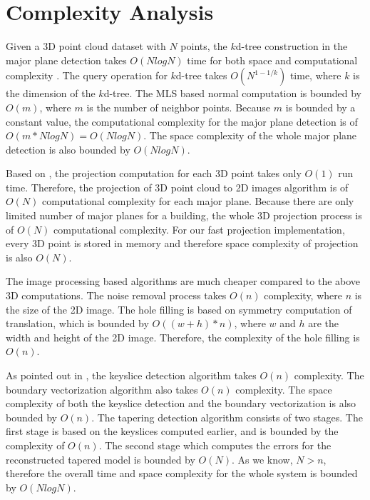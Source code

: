 

\section{Complexity Analysis}
Given a 3D point cloud dataset with $N$ points,
the $k$d-tree construction in the major plane detection
takes $O(NlogN)$ time for both space and computational complexity \cite{NE_KD}.
The query operation for $k$d-tree takes $O(N^{1-1/k})$ time,
where $k$ is the dimension of the $k$d-tree.
The MLS based normal computation is bounded by $O(m)$,
where $m$ is the number of neighbor points.
Because $m$ is bounded by a constant value,
the computational complexity for the major plane detection
is of $O(m*NlogN) = O(NlogN)$.
The space complexity of the whole major plane detection
is also bounded by $O(NlogN)$.

Based on , the projection computation for each 3D point
takes only $O(1)$ run time.
Therefore, the projection of 3D point cloud to 2D images algorithm
is of $O(N)$ computational complexity for each major plane.
Because there are only limited number of major planes for a building,
the whole 3D projection process is of $O(N)$ computational complexity.
For our fast projection implementation,
every 3D point is stored in memory and therefore
space complexity of projection is also $O(N)$.

The image processing based algorithms are much cheaper
compared to the above 3D computations.
The noise removal process takes $O(n)$ complexity,
where $n$ is the size of the 2D image.
The hole filling is based on symmetry computation of translation,
which is bounded by $O((w+h)*n)$,
where $w$ and $h$ are the width and height of the 2D image.
Therefore, the complexity of the hole filling is $O(n)$.

As pointed out in , the keyslice detection algorithm
takes $O(n)$ complexity.
The boundary vectorization algorithm also takes $O(n)$ complexity.
The space complexity of both the keyslice detection and
the boundary vectorization is also bounded by $O(n)$.
The tapering detection algorithm consists of two stages.
The first stage is based on the keyslices computed earlier,
and is bounded by the complexity of $O(n)$.
The second stage which computes the errors
for the reconstructed tapered model is bounded by $O(N)$.
As we know, $N > n$, therefore the overall time and space complexity
for the whole system is bounded by $O(NlogN)$.


